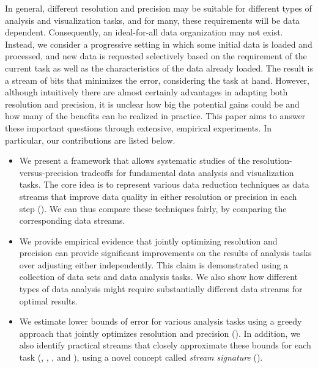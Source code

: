 In general, different
resolution and precision may be suitable for different types of analysis and visualization tasks,
and for many, these requirements will be
data dependent. Consequently, an ideal-for-all data organization may not exist. 
Instead, we consider a progressive setting in which some initial data is loaded
and processed, and new data is requested selectively based on the requirement
of the current task as well as the characteristics of the data already loaded. The
result is a stream of bits that minimizes the error, considering the task at hand.
However, although intuitively there are almost certainly advantages in adapting
both resolution and precision, it is unclear how big the potential gains could
be   and how many of the benefits can be
realized in practice.  This paper aims to answer these important questions
through extensive, empirical experiments. In particular, our contributions are
listed below.

\begin{itemize}
%
\item We present a framework that allows systematic studies of the
resolution-versus-precision tradeoffs for fundamental data analysis and
visualization tasks. The core idea is to represent various data reduction
techniques as data streams that improve data quality in either resolution or
precision in each step (). We can
thus compare these techniques fairly, by comparing the corresponding data
streams.
%  
\item We provide empirical evidence that jointly optimizing resolution and
precision can provide significant improvements on the results of analysis tasks
over adjusting either independently.  This claim is demonstrated using a
collection of data sets and data analysis tasks. We also show how different
types of data analysis might require substantially different data streams for
optimal results.
%
\item We estimate lower bounds of error  for various analysis tasks using a greedy approach
that jointly optimizes resolution and precision ().
 In addition, we also identify practical streams that
closely approximate these bounds for each task (,
, , and ), using
a novel concept called \emph{stream signature} ().
\end{itemize}

